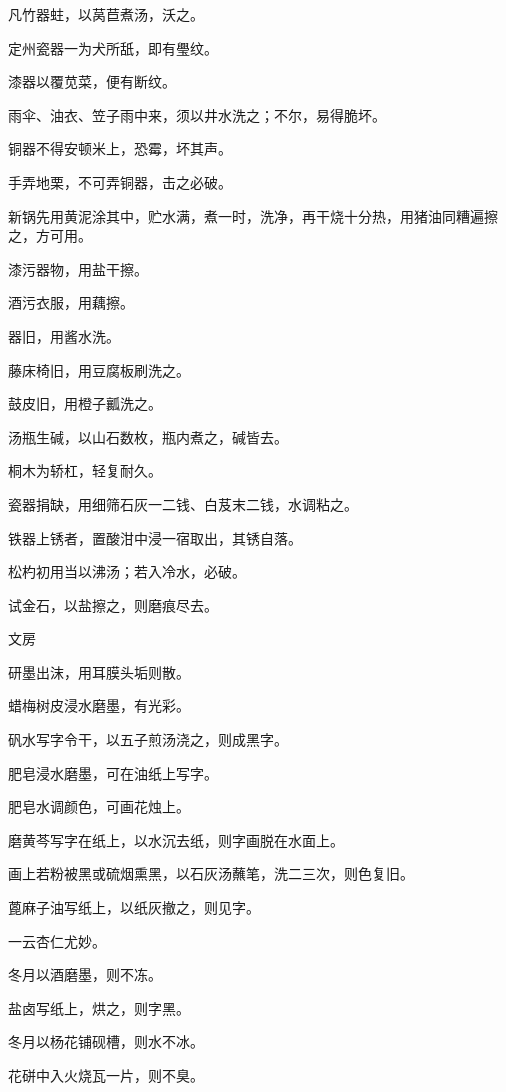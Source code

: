 \documentclass[a4paper,12pt,UTF8,twoside]{ctexbook}
\begin{document}
    凡竹器蛀，以莴苣煮汤，沃之。
    
    定州瓷器一为犬所舐，即有璺纹。
    
    漆器以覆苋菜，便有断纹。
    
    雨伞、油衣、笠子雨中来，须以井水洗之；不尔，易得脆坏。
    
    铜器不得安顿米上，恐霉，坏其声。
    
    手弄地栗，不可弄铜器，击之必破。
    
    新锅先用黄泥涂其中，贮水满，煮一时，洗净，再干烧十分热，用猪油同糟遍擦之，方可用。
    
    漆污器物，用盐干擦。
    
    酒污衣服，用藕擦。
    
    器旧，用酱水洗。
    
    藤床椅旧，用豆腐板刷洗之。
    
    鼓皮旧，用橙子瓤洗之。
    
    汤瓶生碱，以山石数枚，瓶内煮之，碱皆去。
    
    桐木为轿杠，轻复耐久。
    
    瓷器捐缺，用细筛石灰一二钱、白芨末二钱，水调粘之。
    
    铁器上锈者，置酸泔中浸一宿取出，其锈自落。
    
    松杓初用当以沸汤；若入冷水，必破。
    
    试金石，以盐擦之，则磨痕尽去。
    
    文房
    
    研墨出沫，用耳膜头垢则散。
    
    蜡梅树皮浸水磨墨，有光彩。
    
    矾水写字令干，以五子煎汤浇之，则成黑字。
    
    肥皂浸水磨墨，可在油纸上写字。
    
    肥皂水调颜色，可画花烛上。
    
    磨黄芩写字在纸上，以水沉去纸，则字画脱在水面上。
    
    画上若粉被黑或硫烟熏黑，以石灰汤蘸笔，洗二三次，则色复旧。
    
    蓖麻子油写纸上，以纸灰撤之，则见字。
    
    一云杏仁尤妙。
    
    冬月以酒磨墨，则不冻。
    
    盐卤写纸上，烘之，则字黑。
    
    冬月以杨花铺砚槽，则水不冰。
    
    花硑中入火烧瓦一片，则不臭。
    
\end{document}
